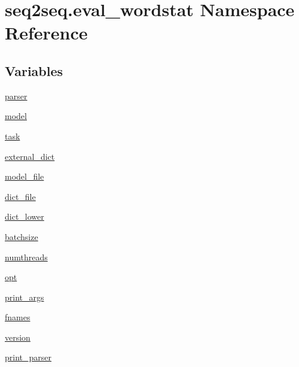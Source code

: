 \hypertarget{namespaceseq2seq_1_1eval__wordstat}{}\section{seq2seq.\+eval\+\_\+wordstat Namespace Reference}
\label{namespaceseq2seq_1_1eval__wordstat}
\subsection*{Variables}
\begin{DoxyCompactItemize}
\item 
\hyperlink{namespaceseq2seq_1_1eval__wordstat_a08ac33c3b3c9bae6a47eea63ae40ae01}{parser}
\item 
\hyperlink{namespaceseq2seq_1_1eval__wordstat_a4e3a8ce76ade36dc6845da2e2882f227}{model}
\item 
\hyperlink{namespaceseq2seq_1_1eval__wordstat_ae7fc745ea4e185e8dea8552919f3e71d}{task}
\item 
\hyperlink{namespaceseq2seq_1_1eval__wordstat_a20f55c53fd6e2f7195256c802d912dae}{external\+\_\+dict}
\item 
\hyperlink{namespaceseq2seq_1_1eval__wordstat_a15cab2281a40a7122745f6b70951d548}{model\+\_\+file}
\item 
\hyperlink{namespaceseq2seq_1_1eval__wordstat_af36cddb86242c21e6ee4d8a5cd303d5e}{dict\+\_\+file}
\item 
\hyperlink{namespaceseq2seq_1_1eval__wordstat_a9c3103a4e7d60da4c81e3ae3c964c600}{dict\+\_\+lower}
\item 
\hyperlink{namespaceseq2seq_1_1eval__wordstat_a41a234e46292d9ae77aa431bd542ccbf}{batchsize}
\item 
\hyperlink{namespaceseq2seq_1_1eval__wordstat_a618bf6901e2f89ad7843af256b248cdd}{numthreads}
\item 
\hyperlink{namespaceseq2seq_1_1eval__wordstat_a38b14cace5d789154434b807b9e217d2}{opt}
\item 
\hyperlink{namespaceseq2seq_1_1eval__wordstat_a51db2b94a0983ad32449f5e3159e7063}{print\+\_\+args}
\item 
\hyperlink{namespaceseq2seq_1_1eval__wordstat_a98b3dd6b5bf78cf8d6b1c15a9d243e8a}{fnames}
\item 
\hyperlink{namespaceseq2seq_1_1eval__wordstat_ac0b00d1f99bfdadc0535936a7b9042eb}{version}
\item 
\hyperlink{namespaceseq2seq_1_1eval__wordstat_aed68902b90c301195f0157209afbaf0a}{print\+\_\+parser}
\end{DoxyCompactItemize}


